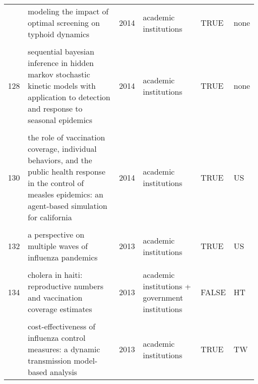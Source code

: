 \documentclass[
]{article}
\begin{document}
\begin{landscape}
\begin{longtable}{l>{\raggedright\arraybackslash}p{4cm}l>{\raggedright\arraybackslash}p{3.5cm}l>{\raggedright\arraybackslash}p{1.5cm}}
\addlinespace
126 & modeling the impact of optimal screening on typhoid dynamics & 2014 & academic institutions & TRUE & none\\
\cellcolor{gray!6}{127} & \cellcolor{gray!6}{modeling the influence of environment and intervention oncholera in haiti} & \cellcolor{gray!6}{2014} & \cellcolor{gray!6}{academic institutions} & \cellcolor{gray!6}{TRUE} & \cellcolor{gray!6}{HT}\\
128 & sequential bayesian inference in hidden markov stochastic kinetic models with application to detection and response to seasonal epidemics & 2014 & academic institutions & TRUE & none\\
\cellcolor{gray!6}{129} & \cellcolor{gray!6}{simulating optimal vaccination times during cholera outbreaks} & \cellcolor{gray!6}{2014} & \cellcolor{gray!6}{academic institutions} & \cellcolor{gray!6}{TRUE} & \cellcolor{gray!6}{none}\\
130 & the role of vaccination coverage, individual behaviors, and the public health response in the control of measles epidemics: an agent-based simulation for california & 2014 & academic institutions & TRUE & US\\
\addlinespace
\cellcolor{gray!6}{131} & \cellcolor{gray!6}{time is (still) of the essence: quantifying the impact of emergency meningitis vaccination response in katsina state, nigeria} & \cellcolor{gray!6}{2014} & \cellcolor{gray!6}{academic institutions + NGO} & \cellcolor{gray!6}{FALSE} & \cellcolor{gray!6}{NG}\\
132 & a perspective on multiple waves of influenza pandemics & 2013 & academic institutions & TRUE & US\\
\cellcolor{gray!6}{133} & \cellcolor{gray!6}{an optimal control problem arising from a dengue disease transmission model} & \cellcolor{gray!6}{2013} & \cellcolor{gray!6}{academic institutions} & \cellcolor{gray!6}{TRUE} & \cellcolor{gray!6}{none}\\
134 & cholera in haiti: reproductive numbers and vaccination coverage estimates & 2013 & academic institutions + government institutions & FALSE & HT\\
\cellcolor{gray!6}{135} & \cellcolor{gray!6}{comparing control strategies against foot-and-mouth disease: will vaccination be cost-effective in denmark?} & \cellcolor{gray!6}{2013} & \cellcolor{gray!6}{academic institutions} & \cellcolor{gray!6}{TRUE} & \cellcolor{gray!6}{DK}\\
\addlinespace
136 & cost-effectiveness of influenza control measures: a dynamic transmission model-based analysis & 2013 & academic institutions & TRUE & TW\\

\end{longtable}
\end{landscape}
\end{document}
